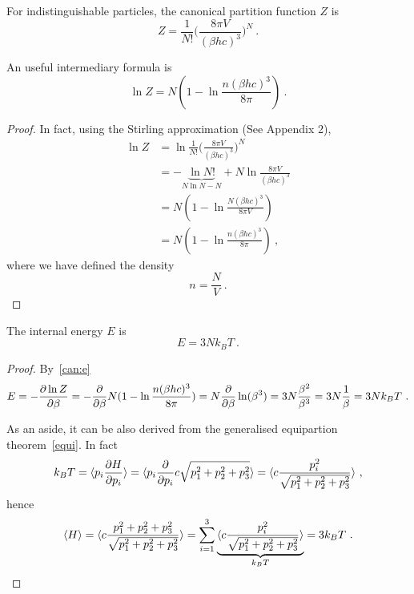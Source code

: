     For indistinguishable particles, the canonical partition function $Z$ is 
    \begin{equation*}
        Z = \frac{1}{N!} \Big (\frac{8\pi V}{(\beta h c)^3} \Big )^N ~.
    \end{equation*}

    An useful intermediary formula is 
    \begin{equation*}
        \ln Z = N (1 - \ln \frac{n (\beta h c)^3}{8\pi}) ~.
    \end{equation*}
    \begin{proof}
        In fact, using the Stirling approximation (See Appendix 2),
        \begin{equation*}
        \begin{aligned}
            \ln Z & = \ln \frac{1}{N!} \Big (\frac{8\pi V}{(\beta h c)^3} \Big )^N \\ & = - \underbrace{\ln N!}_{N \ln N - N} + N \ln \frac{8\pi V}{(\beta h c)^3} \\ & = N (1 - \ln \frac{N (\beta h c)^3}{8\pi V}) \\ & = N (1 - \ln \frac{n (\beta h c)^3}{8\pi})  ~,
        \end{aligned}
        \end{equation*}
        where we have defined the density
        \begin{equation*}
            n = \frac{N}{V} ~.
        \end{equation*}
    \end{proof}
    
    The internal energy $E$ is 
    \begin{equation*}
        E = 3 N k_B T ~.
    \end{equation*}
    \begin{proof}
        By~\eqref{can:e}
        \begin{equation*}
            E = - \frac{\partial\ln Z}{\partial\beta} = - \frac{\partial}{\partial\beta} N (1 - \ln \frac{n (\beta h c)^3}{8\pi}) = N \frac{\partial}{\partial\beta} \ln (\beta^3) = 3 N \frac{\beta^2}{\beta^3} = 3 N \frac{1}{\beta} = 3 N k_B T ~.
        \end{equation*}

        As an aside, it can be also derived from the generalised equipartion theorem~\eqref{equi}. In fact
        \begin{equation*}
            k_B T = \langle p_i \frac{\partial H}{\partial p_i}\rangle = \langle p_i \frac{\partial}{\partial p_i} c \sqrt{p_1^2 + p_2^2 + p_3^2}\rangle = \langle c \frac{p_i^2}{\sqrt{p_1^2 + p_2^2 + p_3^2}}\rangle ~,
        \end{equation*}
        hence 
        \begin{equation*}
            \langle H\rangle = \langle c \frac{p_1^2 + p_2^2 + p_3^2}{\sqrt{p_1^2 + p_2^2 + p_3^2}}\rangle = \sum_{i=1}^3 \underbrace{\langle c \frac{p_i^2}{\sqrt{p_1^2 + p_2^2 + p_3^2}}\rangle}_{k_B T} = 3 k_B T ~.
        \end{equation*}
    \end{proof}
    
